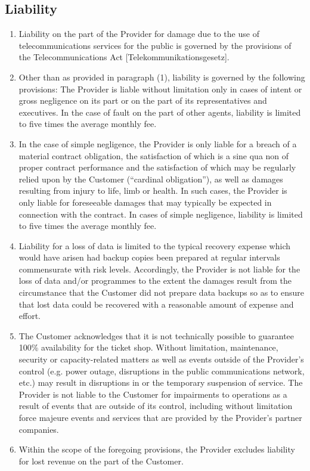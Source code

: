 \documentclass{terms}
\begin{document}
\subsection{Liability}
\begin{enumerate}
\item Liability on the part of the Provider for damage due to the use of telecommunications services for the public is governed by the provisions of the Telecommunications Act [Telekommunikationsgesetz].
\item Other than as provided in paragraph (1), liability is governed by the following provisions: The Provider is liable without limitation only in cases of intent or gross negligence on its part or on the part of its representatives and executives. In the case of fault on the part of other agents, liability is limited to five times the average monthly fee.
\item In the case of simple negligence, the Provider is only liable for a breach of a material contract obligation, the satisfaction of which is a sine qua non of proper contract performance and the satisfaction of which may be regularly relied upon by the Customer (“cardinal obligation”), as well as damages resulting from injury to life, limb or health. In such cases, the Provider is only liable for foreseeable damages that may typically be expected in connection with the contract. In cases of simple negligence, liability is limited to five times the average monthly fee.
\item Liability for a loss of data is limited to the typical recovery expense which would have arisen had backup copies been prepared at regular intervals commensurate with risk levels. Accordingly, the Provider is not liable for the loss of data and/or programmes to the extent the damages result from the circumstance that the Customer did not prepare data backups so as to ensure that lost data could be recovered with a reasonable amount of expense and effort.
\item The Customer acknowledges that it is not technically possible to guarantee 100\% availability for the ticket shop. Without limitation, maintenance, security or capacity-related matters as well as events outside of the Provider's control (e.g. power outage, disruptions in the public communications network, etc.) may result in disruptions in or the temporary suspension of service. The Provider is not liable to the Customer for impairments to operations as a result of events that are outside of its control, including without limitation force majeure events and services that are provided by the Provider's partner companies.
\item Within the scope of the foregoing provisions, the Provider excludes liability for lost revenue on the part of the Customer.
\end{enumerate}
\end{document}
